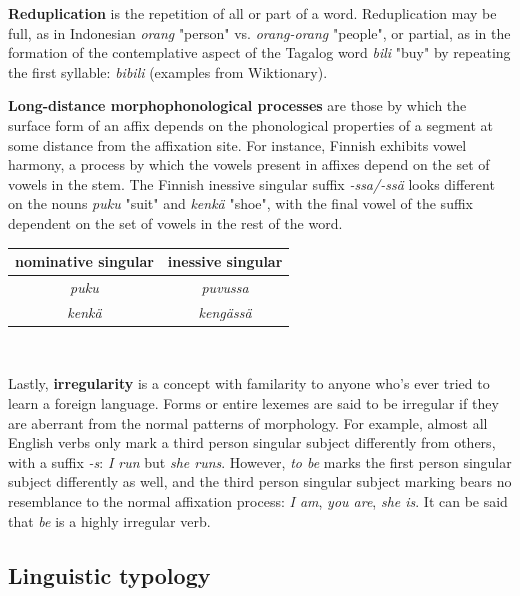 \textbf{Reduplication} is the repetition of all or part of a word. Reduplication may be full, as in Indonesian \textit{orang} "person" vs. \textit{orang-orang} "people", or partial, as in the formation of the contemplative aspect of the Tagalog word \textit{bili} "buy" by repeating the first syllable: \textit{bibili} (examples from Wiktionary). 

\textbf{Long-distance morphophonological processes} are those by which the surface form of an affix depends on the phonological properties of a segment at some distance from the affixation site. For instance, Finnish exhibits vowel harmony, a process by which the vowels present in affixes depend on the set of vowels in the stem. The Finnish inessive singular suffix \textit{-ssa/-ssä} looks different on the nouns \textit{puku} "suit" and \textit{kenkä} "shoe", with the final vowel of the suffix dependent on the set of vowels in the rest of the word. 

\begin{center}
\begin{tabular}{|c|c|}
\hline
nominative singular & inessive singular \\
\hline \hline
\textit{puku} & \textit{puvussa} \\
\hline 
\textit{kenkä} & \textit{kengässä} \\
\hline
\end{tabular} \\
\vspace{.3cm}
\parencite{Wiktionary}
\end{center}

Lastly, \textbf{irregularity} is a concept with familarity to anyone who's ever tried to learn a foreign language. Forms or entire lexemes are said to be irregular if they are aberrant from the normal patterns of morphology. For example, almost all English verbs only mark a third person singular subject differently from others, with a suffix \textit{-s}: \textit{I run} but \textit{she runs}. However, \textit{to be} marks the first person singular subject differently as well, and the third person singular subject marking bears no resemblance to the normal affixation process: \textit{I am}, \textit{you are}, \textit{she is}. It can be said that \textit{be} is a highly irregular verb.

\subsection{Linguistic typology}

